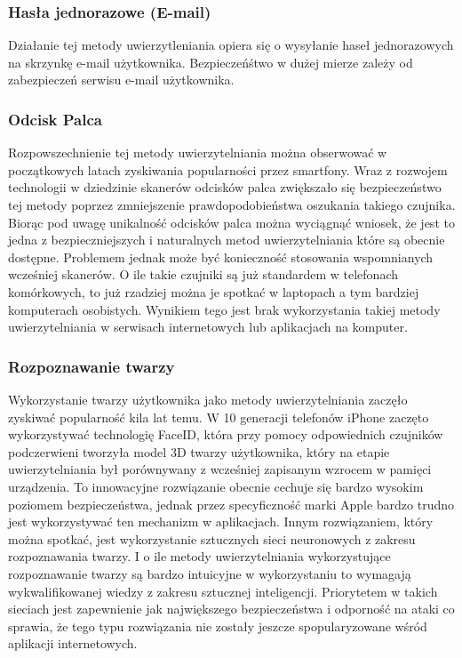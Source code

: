 \subsubsection{Hasła jednorazowe (E-mail)} Działanie tej metody uwierzytleniania opiera się o wysyłanie haseł jednorazowych na skrzynkę e-mail użytkownika. Bezpieczeńśtwo w dużej mierze zależy od zabezpieczeń serwisu e-mail użytkownika. 
\subsubsection{Odcisk Palca} Rozpowszechnienie tej metody uwierzytelniania można obserwować w początkowych latach zyskiwania popularności przez smartfony. Wraz z rozwojem technologii w dziedzinie skanerów odcisków palca zwiększało się bezpieczeństwo tej metody poprzez zmniejszenie prawdopodobieństwa oszukania takiego czujnika. Biorąc pod uwagę unikalność odcisków palca można wyciągnąć wniosek, że jest to jedna z bezpieczniejszych i naturalnych metod uwierzytelniania które są obecnie dostępne. Problemem jednak może być konieczność stosowania wspomnianych wcześniej skanerów. O ile takie czujniki są już standardem w telefonach komórkowych, to już rzadziej można je spotkać w laptopach a tym bardziej komputerach osobistych. Wynikiem tego jest brak wykorzystania takiej metody uwierzytelniania w serwisach internetowych lub aplikacjach na komputer.
\subsubsection{Rozpoznawanie twarzy} Wykorzystanie twarzy użytkownika jako metody uwierzytelniania zaczęło zyskiwać popularność kila lat temu. W 10 generacji telefonów iPhone zaczęto wykorzystywać technologię FaceID, która przy pomocy odpowiednich czujników podczerwieni tworzyła model 3D twarzy użytkownika, który na etapie uwierzytelniania był porównywany z wcześniej zapisanym wzrocem w pamięci urządzenia. To innowacyjne rozwiązanie obecnie cechuje się bardzo wysokim poziomem bezpieczeństwa, jednak przez specyficzność marki Apple bardzo trudno jest wykorzystywać ten mechanizm w aplikacjach. Innym rozwiązaniem, który można spotkać, jest wykorzystanie sztucznych sieci neuronowych z zakresu rozpoznawania twarzy. I o ile metody uwierzytelniania wykorzystujące rozpoznawanie twarzy są bardzo intuicyjne w wykorzystaniu to wymagają wykwalifikowanej wiedzy z zakresu sztucznej inteligencji. Priorytetem w takich sieciach jest zapewnienie jak największego bezpieczeństwa i odporność na ataki co sprawia, że tego typu rozwiązania nie zostały jeszcze spopularyzowane wśród aplikacji internetowych.
 

